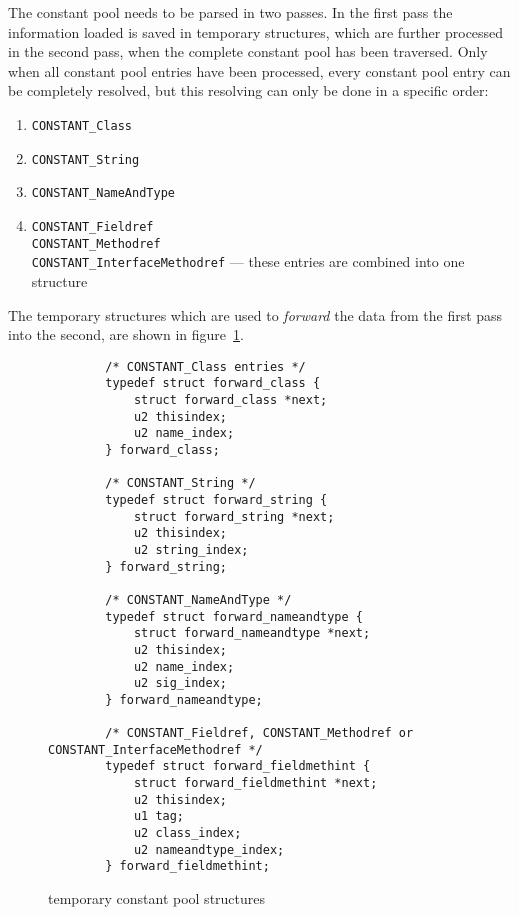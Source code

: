 The constant pool needs to be parsed in two passes. In the first pass
the information loaded is saved in temporary structures, which are
further processed in the second pass, when the complete constant pool
has been traversed. Only when all constant pool entries have been
processed, every constant pool entry can be completely resolved, but
this resolving can only be done in a specific order:

\begin{enumerate}
 \item \texttt{CONSTANT\_Class}

 \item \texttt{CONSTANT\_String}

 \item \texttt{CONSTANT\_NameAndType}

 \item \texttt{CONSTANT\_Fieldref} \\ \texttt{CONSTANT\_Methodref} \\
 \texttt{CONSTANT\_InterfaceMethodref} --- these entries are combined
 into one structure
\end{enumerate}

The temporary structures which are used to \textit{forward} the data
from the first pass into the second, are shown in
figure~\ref{constantpoolstructures}.

\begin{figure}[h]
\begin{verbatim}
        /* CONSTANT_Class entries */
        typedef struct forward_class {
            struct forward_class *next;
            u2 thisindex;
            u2 name_index;
        } forward_class;

        /* CONSTANT_String */
        typedef struct forward_string {
            struct forward_string *next;
            u2 thisindex;
            u2 string_index;
        } forward_string;

        /* CONSTANT_NameAndType */
        typedef struct forward_nameandtype {
            struct forward_nameandtype *next;
            u2 thisindex;
            u2 name_index;
            u2 sig_index;
        } forward_nameandtype;

        /* CONSTANT_Fieldref, CONSTANT_Methodref or CONSTANT_InterfaceMethodref */
        typedef struct forward_fieldmethint {
            struct forward_fieldmethint *next;
            u2 thisindex;
            u1 tag;
            u2 class_index;
            u2 nameandtype_index;
        } forward_fieldmethint;
\end{verbatim}
\caption{temporary constant pool structures}
\label{constantpoolstructures}
\end{figure}

